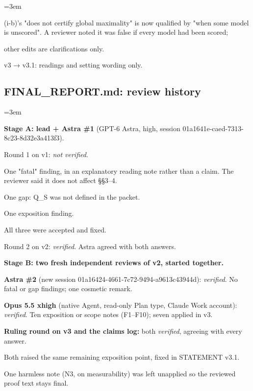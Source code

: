 \documentclass[11pt]{report}
\newenvironment{mdblock}{\begingroup\mdfont\raggedright\setlength{\parindent}{0pt}\setlength{\parskip}{0.55em}\emergencystretch=3em}{\par\endgroup}
\newcommand{\mdhead}[2]{\par\vspace{0.7em}\noindent{\bfseries\ifcase#1\or\large\or\normalsize\or\normalsize\or\small\or\small\or\small\fi #2}\par\nopagebreak\vspace{0.1em}}
\newcommand{\mdsubsec}[1]{\phantomsection\subsection*{#1}}
\begin{document}
\begin{mdblock}
\begin{mdbul}
\begin{mdbul}
\item (i-b)'s "does not certify global maximality" is now qualified by "when some model is unscored". A reviewer noted it was false if every model had been scored;
\item other edits are clarifications only.
\end{mdbul}
\item v3 → v3.1: readings and setting wording only.
\end{mdbul}
\end{mdblock}

\mdsubsec{FINAL\_REPORT.md: review history}
\begin{mdblock}
\mdhead{2}{3. Review history}

\textbf{Stage A: lead + Astra \#1} (GPT-6 Astra, high, session 01a1641e-caed-7313-8c23-8d32e3a413f3).

\begin{mdbul}
\item Round 1 on v1: \emph{not verified}.

\begin{mdbul}
\item One "fatal" finding, in an explanatory reading note rather than a claim. The reviewer said it does not affect §§3–4.
\item One gap: Q\_S was not defined in the packet.
\item One exposition finding.
\item All three were accepted and fixed.
\end{mdbul}
\item Round 2 on v2: \emph{verified}. Astra agreed with both answers.
\end{mdbul}

\textbf{Stage B: two fresh independent reviews of v2, started together.}

\begin{mdbul}
\item \textbf{Astra \#2} (new session 01a16424-4661-7c72-9494-a9613c43944d): \emph{verified}. No fatal or gap findings; one cosmetic remark.
\item \textbf{Opus 5.5 xhigh} (native Agent, read-only Plan type, Claude Work account): \emph{verified}. Ten exposition or scope notes (F1–F10); seven applied in v3.
\item \textbf{Ruling round on v3 and the claims log:} both \emph{verified}, agreeing with every answer.

\begin{mdbul}
\item Both raised the same remaining exposition point, fixed in STATEMENT v3.1.
\item One harmless note (N3, on measurability) was left unapplied so the reviewed proof text stays final.
\end{mdbul}
\end{mdbul}


\end{mdblock}
\end{document}
